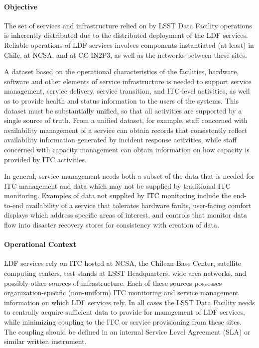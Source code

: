 \paragraph{Objective}

The set of services and infrastructure relied on by LSST Data Facility 
operations is inherently distributed due to the distributed deployment of the 
LDF services. Reliable operations of LDF services involves components 
instantiated (at least) in Chile, at NCSA, and at CC-IN2P3, as well as the 
networks between these sites. 

A dataset based on the operational characteristics of the facilities, hardware, 
software and other elements of service infrastructure is needed to support 
service management, service delivery, service transition, and ITC-level 
activities, as well as to provide health and status information to the users of 
the systems. This dataset must be substantially unified, so that all activities 
are supported by a single source of truth. From a unified dataset, for example, 
staff concerned with availability management of a service can obtain records 
that consistently reflect availability information generated by incident response 
activities, while staff concerned with capacity management can obtain 
information on how capacity is provided by ITC activities. 

In general, service management needs both a subset of the data that is needed 
for ITC management and data which may not be supplied by traditional ITC 
monitoring. Examples of data not supplied by ITC monitoring include the 
end-to-end availability of a service that tolerates hardware faults, user-facing 
comfort displays which address specific areas of interest, and controls that 
monitor data flow into disaster recovery stores for consistency with creation of data.

\paragraph{Operational Context}

LDF services rely on ITC hosted at NCSA, the Chilean Base Center, satellite 
computing centers, test stands at LSST Headquarters, wide area networks, and 
possibly other sources of infrastructure. Each of these sources possesses 
organization-specific (non-uniform) ITC monitoring and service management 
information on which LDF services rely. In all cases the LSST Data Facility needs 
to centrally acquire sufficient data to provide for management of LDF services, 
while minimizing coupling to the ITC or service provisioning from these sites. 
The coupling should be defined in an internal Service Level Agreement (SLA) or 
similar written instrument.

